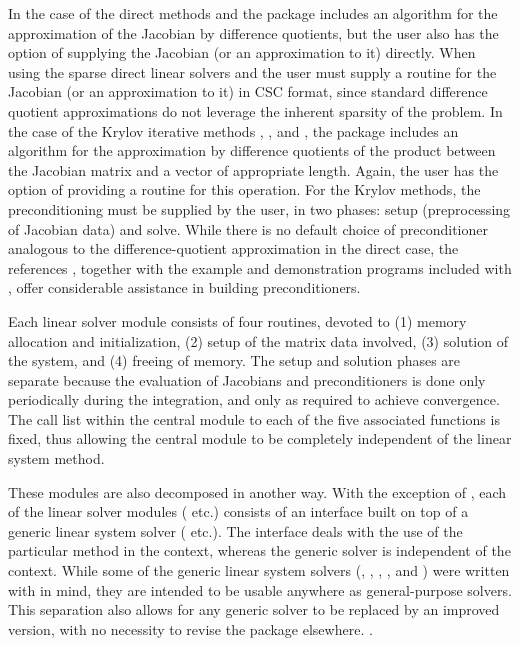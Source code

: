 In the case of the direct methods {\cvdense} and {\cvband}
the package includes an algorithm for the approximation of the Jacobian by difference
quotients, but the user also has the option of supplying the Jacobian
(or an approximation to it) directly.  When using the sparse direct
linear solvers {\cvklu} and {\cvsuperlumt} the user must supply a
routine for the Jacobian (or an approximation to it) in CSC format,
since standard difference quotient approximations do not leverage the
inherent sparsity of the problem. In the case of the Krylov iterative
methods {\cvspgmr}, {\cvspbcg}, and {\cvsptfqmr}, the package includes an algorithm
for the approximation by difference quotients of the product between the Jacobian
matrix and a vector of appropriate length. Again, the user has the option of
providing a routine for this operation.
For the Krylov methods, 
the preconditioning must be supplied by the user, in two phases: 
setup (preprocessing of Jacobian data) and solve.
While there is no default choice of
preconditioner analogous to the difference-quotient approximation
in the direct case, the references \cite{BrHi:89,Byr:92}, together
with the example and demonstration programs included with {\cvode}, offer
considerable assistance in building preconditioners.

Each {\cvode} linear solver module consists of four routines, devoted to (1)
memory allocation and initialization, (2) setup of the matrix data
involved, (3) solution of the system, and (4) freeing of memory.  
The setup and solution phases are separate because the evaluation of
Jacobians and preconditioners is done only periodically during the
integration, and only as required to achieve convergence. The call list within
the central {\cvode} module to each of the five associated functions is
fixed, thus allowing the central module to be completely independent
of the linear system method.

These modules are also decomposed in another way.
With the exception of {\cvdiag}, each of the linear solver modules
({\cvdense} etc.) consists of an interface built on top of a generic linear
system solver ({\dense} etc.).  The interface deals with the use of the
particular method in the {\cvode} context, whereas the generic solver is
independent of the context.  While some of the generic linear system solvers
({\dense}, {\band}, {\spgmr}, {\spbcg}, and {\sptfqmr}) were written with
{\sundials} in mind, they are intended to be usable anywhere as general-purpose
solvers.  This separation also allows for any generic solver to be replaced by
an improved version, with no necessity to revise the {\cvode} package elsewhere.
.

